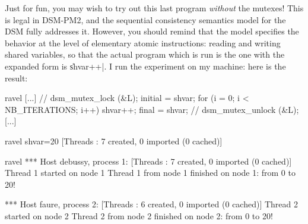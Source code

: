 Just for fun, you may wish to try out this last program \emph{without}
the mutexes! This is legal in DSM-PM2, and the sequential consistency
semantics model for the DSM fully addresses it. However, you should
remind that the model specifies the behavior at the level of
elementary atomic instructions: reading and writing shared variables,
so that the actual program which is run is the one with the expanded
form is \|shvar++|.  I run the experiment on my machine: here is the
result:
\begin{shell}
ravel%
[...]
  // dsm_mutex_lock (&L);
  initial = shvar;
  for (i = 0; i < NB_ITERATIONS; i++)
    shvar++;
  final = shvar;
  // dsm_mutex_unlock (&L);
[...]

ravel%
shvar=20
[Threads : 7 created, 0 imported (0 cached)]

ravel%
*** Host debussy, process 1:
[Threads : 7 created, 0 imported (0 cached)]
Thread 1 started on node 1
Thread 1 from node 1 finished on node 1: from 0 to 20!

*** Host faure, process 2:
[Threads : 6 created, 0 imported (0 cached)]
Thread 2 started on node 2
Thread 2 from node 2 finished on node 2: from 0 to 20!
\end{shell}
